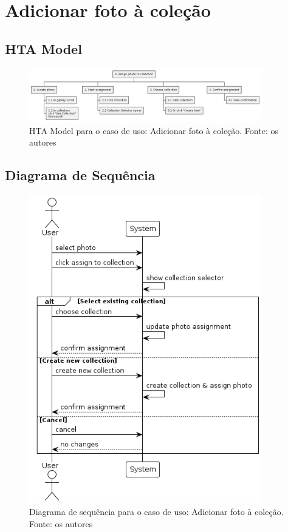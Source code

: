 \section{Adicionar foto à coleção}

\subsection{HTA Model}

\begin{figure}[H]
    \centering
    \includegraphics[width=0.9\textwidth]{../figures/hta/UC003.png}
    \caption{HTA Model para o caso de uso: Adicionar foto à coleção. Fonte: os autores}
    \label{fig:hta-uc003}
\end{figure}

\subsection{Diagrama de Sequência}

\begin{figure}[H]
    \centering
    \includegraphics[width=0.9\textwidth]{../figures/dss/UC003.png}
    \caption{Diagrama de sequência para o caso de uso: Adicionar foto à coleção. Fonte: os autores}
    \label{fig:dss-uc003}
\end{figure}

